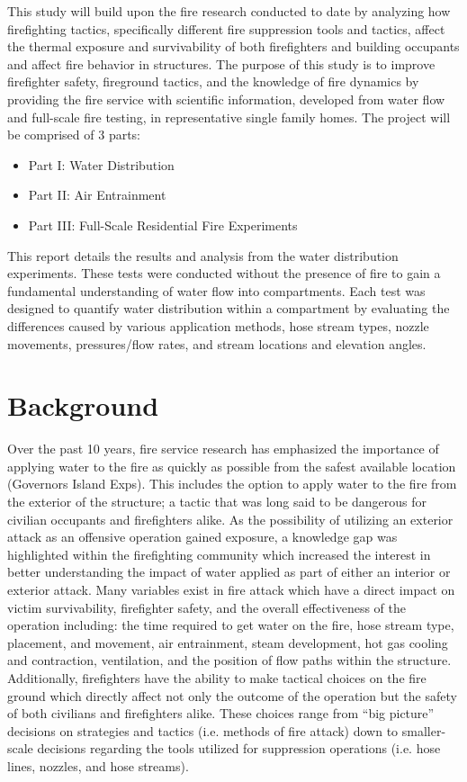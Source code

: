 \documentclass[12pt,oneside]{book}
\begin{document}
This study will build upon the fire research conducted to date by analyzing how firefighting tactics, specifically different fire suppression tools and tactics, affect the thermal exposure and survivability of both firefighters and building occupants and affect fire behavior in structures. The purpose of this study is to improve firefighter safety, fireground tactics, and the knowledge of fire dynamics by providing the fire service with scientific information, developed from water flow and full-scale fire testing, in representative single family homes. The project will be comprised of 3 parts:

\begin{itemize}
	\setlength{\itemindent}{0.25in}
	\item Part I:  Water Distribution
	\item Part II: Air Entrainment
	\item Part III: Full-Scale Residential Fire Experiments
	\end{itemize}

This report details the results and analysis from the water distribution experiments. These tests were conducted without the presence of fire to gain a fundamental understanding of water flow into compartments. Each test was designed to quantify water distribution within a compartment by evaluating the differences caused by various application methods, hose stream types, nozzle movements, pressures/flow rates, and stream locations and elevation angles. 


\chapter{Background}

Over the past 10 years, fire service research has emphasized the importance of applying water to the fire as quickly as possible from the safest available location (Governors Island Exps). This includes the option to apply water to the fire from the exterior of the structure; a tactic that was long said to be dangerous for civilian occupants and firefighters alike. As the possibility of utilizing an exterior attack as an offensive operation gained exposure, a knowledge gap was highlighted within the firefighting community which increased the interest in better understanding the impact of water applied as part of either an interior or exterior attack. Many variables exist in fire attack which have a direct impact on victim survivability, firefighter safety, and the overall effectiveness of the operation including: the time required to get water on the fire, hose stream type, placement, and movement, air entrainment, steam development, hot gas cooling and contraction, ventilation, and the position of flow paths within the structure. Additionally, firefighters have the ability to make tactical choices on the fire ground which directly affect not only the outcome of the operation but the safety of both civilians and firefighters alike. These choices range from ``big picture'' decisions on strategies and tactics (i.e. methods of fire attack) down to smaller-scale decisions regarding the tools utilized for suppression operations (i.e. hose lines, nozzles, and hose streams). 
\end{document}
